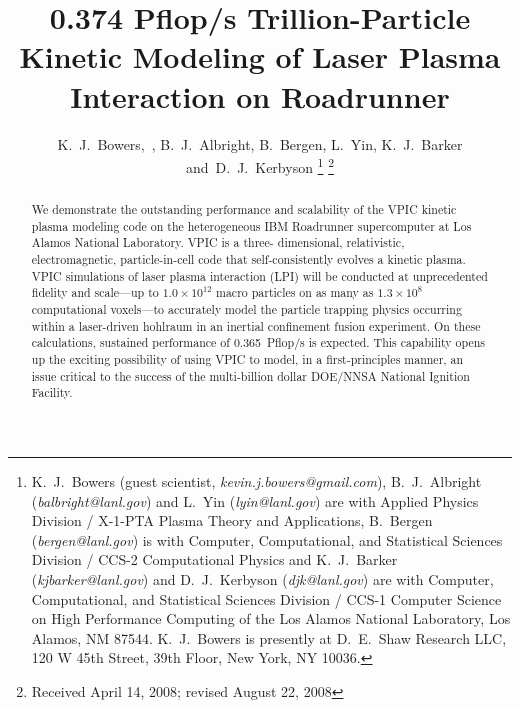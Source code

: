 \documentclass[journal,twoside]{IEEEtran}
\begin{document}
\title{0.374 Pflop/s Trillion-Particle Kinetic Modeling of Laser Plasma
Interaction on Roadrunner}

\author{K.~J.~Bowers,~,
        B.~J.~Albright,
        B.~Bergen,
        L.~Yin,
        K.~J.~Barker
        and~D.~J.~Kerbyson%
\thanks{
K.~J.~Bowers (guest scientist, \emph{kevin.j.bowers@gmail.com}),
B.~J.~Albright (\emph{balbright@lanl.gov}) and L.~Yin
(\emph{lyin@lanl.gov}) are with Applied Physics Division / X-1-PTA
Plasma Theory and Applications, B.~Bergen (\emph{bergen@lanl.gov}) is
with Computer, Computational, and Statistical Sciences Division /
CCS-2 Computational Physics and K.~J.~Barker
(\emph{kjbarker@lanl.gov}) and D.~J.~Kerbyson (\emph{djk@lanl.gov})
are with Computer, Computational, and Statistical Sciences Division /
CCS-1 Computer Science on High Performance Computing of the Los Alamos
National Laboratory, Los Alamos, NM 87544.  K.~J.~Bowers is presently
at D.~E.~Shaw Research LLC, 120 W 45th Street, 39th Floor, New York,
NY 10036.}%
\thanks{Received April 14, 2008; revised August 22, 2008}
}


\maketitle

\begin{abstract}
We demonstrate the outstanding performance and scalability of the VPIC
kinetic plasma modeling code on the heterogeneous IBM Roadrunner
supercomputer at Los Alamos National Laboratory.  VPIC is a three-
dimensional, relativistic, electromagnetic, particle-in-cell code that
self-consistently evolves a kinetic plasma.  VPIC simulations of laser
plasma interaction (LPI) will be conducted at unprecedented fidelity
and scale---up to $1.0 \times 10^{12}$ macro particles on as many as
$1.3 \times 10^8$ computational voxels---to accurately model the
particle trapping physics occurring within a laser-driven hohlraum in
an inertial confinement fusion experiment.  On these calculations,
sustained performance of 0.365~Pflop/s is expected.  This capability
opens up the exciting possibility of using VPIC to model, in a
first-principles manner, an issue critical to the success of the
multi-billion dollar DOE/NNSA National Ignition Facility.
\end{abstract}
\end{document}
